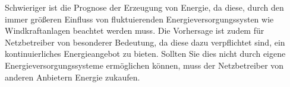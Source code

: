 Schwieriger ist die Prognose der Erzeugung von Energie, da diese, durch den
immer größeren Einfluss von fluktuierenden Energieversorgungssysten wie
Windkraftanlagen beachtet werden muss. Die Vorhersage ist zudem für
Netzbetreiber von besonderer Bedeutung, da diese dazu verpflichtet sind, ein
kontinuierliches Energieangebot zu bieten. Sollten Sie dies nicht durch eigene
Energieversorgungssysteme ermöglichen können, muss der Netzbetreiber von
anderen Anbietern Energie zukaufen. \cite{deppekunstliche}\\